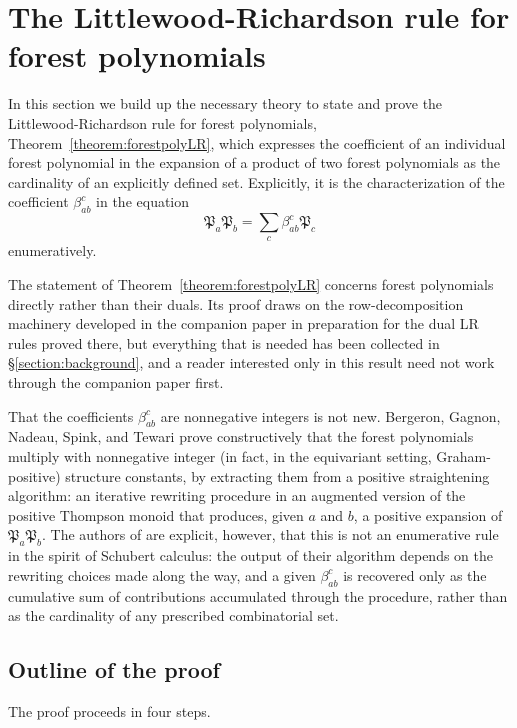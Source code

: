 \documentclass[pdflatex,sn-mathphys-num]{sn-jnl}
\numberwithin{equation}{subsection}
\newcommand{\forest}{\mathfrak{P}}
\theoremstyle{thmstyleone}
\theoremstyle{thmstylethree}
\theoremstyle{thmstyletwo}
\begin{document}
\section{The Littlewood-Richardson rule for forest polynomials}\label{section:forestrule}

In this section we build up the necessary theory to state and prove the Littlewood-Richardson rule for forest polynomials, Theorem~\ref{theorem:forestpolyLR}, which expresses the coefficient of an individual forest polynomial in the expansion of a product of two forest polynomials as the cardinality of an explicitly defined set. Explicitly, it is the characterization of the coefficient $\beta_{ab}^c$ in the equation
$$\forest_a\forest_b = \sum_{c}\beta_{ab}^c\forest_c$$
enumeratively.

The statement of Theorem~\ref{theorem:forestpolyLR} concerns forest polynomials directly rather than their duals. Its proof draws on the row-decomposition machinery developed in the companion paper \cite{samuelbialgebra} in preparation for the dual LR rules proved there, but everything that is needed has been collected in \S\ref{section:background}, and a reader interested only in this result need not work through the companion paper first.

That the coefficients $\beta_{ab}^c$ are nonnegative integers is not new. Bergeron, Gagnon, Nadeau, Spink, and Tewari \cite{bergeron2025equivariant} prove constructively that the forest polynomials multiply with nonnegative integer (in fact, in the equivariant setting, Graham-positive) structure constants, by extracting them from a positive straightening algorithm: an iterative rewriting procedure in an augmented version of the positive Thompson monoid that produces, given $a$ and $b$, a positive expansion of $\forest_a \forest_b$. The authors of \cite{bergeron2025equivariant} are explicit, however, that this is not an enumerative rule in the spirit of Schubert calculus: the output of their algorithm depends on the rewriting choices made along the way, and a given $\beta_{ab}^c$ is recovered only as the cumulative sum of contributions accumulated through the procedure, rather than as the cardinality of any prescribed combinatorial set.


\subsection*{Outline of the proof}

The proof proceeds in four steps.
\end{document}
